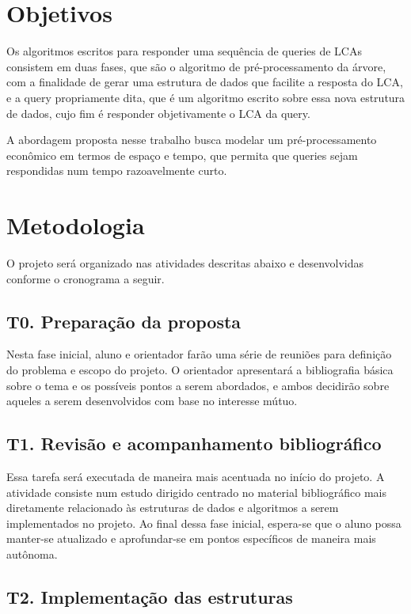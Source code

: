 \documentclass[12pt, a4paper, oneside]{article}
\begin{document}
\clearpage
\section{Objetivos}

Os algoritmos escritos para responder uma sequência de queries de LCAs consistem em duas fases, que são o algoritmo de pré-processamento da árvore, com a finalidade de gerar uma estrutura de dados que facilite a resposta do LCA, e a query propriamente dita, que é um algoritmo escrito sobre essa nova estrutura de dados, cujo fim é responder objetivamente o LCA da query.

A abordagem proposta nesse trabalho busca modelar um pré-processamento econômico em termos de espaço e tempo, que permita que queries sejam respondidas num tempo razoavelmente curto.


\clearpage
\section{Metodologia}

O projeto será organizado nas atividades descritas abaixo e desenvolvidas conforme o cronograma a seguir.

\subsection{T0. Preparação da proposta}

Nesta fase inicial, aluno e orientador farão uma série de reuniões para definição do problema e escopo do projeto. O orientador apresentará a bibliografia básica sobre o tema e os possíveis pontos a serem abordados, e ambos decidirão sobre aqueles a serem desenvolvidos com base no  interesse mútuo.

\subsection{T1. Revisão e acompanhamento bibliográfico}

Essa tarefa será executada de maneira mais acentuada no início do projeto. A atividade consiste num estudo dirigido centrado no  material bibliográfico mais diretamente relacionado às estruturas de dados e algoritmos a serem implementados no projeto. Ao final dessa fase inicial, espera-se que o aluno possa manter-se atualizado e aprofundar-se em pontos específicos de maneira mais autônoma.


\subsection{T2. Implementação das estruturas}
\end{document}
